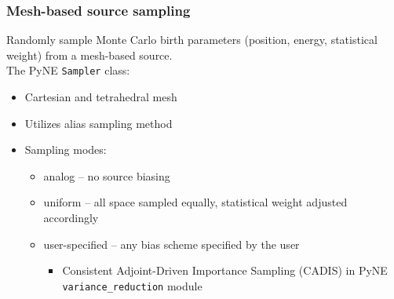\documentclass[xcolor=x11names,compress]{beamer}
\begin{document}
\begin{frame}
\frametitle{Mesh-based source sampling}

Randomly sample Monte Carlo birth parameters (position, energy, statistical weight) from a mesh-based source.\\
\vspace{0.3cm}
The PyNE \texttt{Sampler} class:
\begin{itemize}
\item{Cartesian and tetrahedral mesh}
\item{Utilizes alias sampling method \cite{smith_analysis_2005}}
\item{Sampling modes:}
  \begin{itemize}
  \item{analog -- no source biasing}
  \item{uniform -- all space sampled equally, statistical weight adjusted accordingly}
  \item{user-specified -- any bias scheme specified by the user}
    \begin{itemize}
    \item{Consistent Adjoint-Driven Importance Sampling (CADIS) \cite{haghighat_monte_2003} in PyNE \texttt{variance\_reduction} module}
    \end{itemize}
  \end{itemize}
\end{itemize}
\end{frame}
\end{document}
